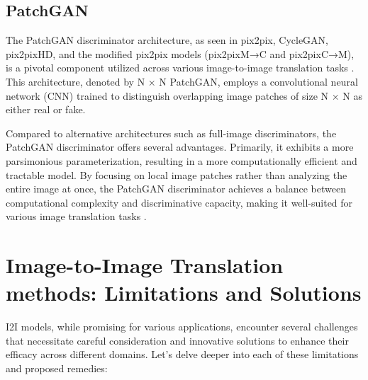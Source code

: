 \documentclass[UKenglish,12pt]{master-style}
\begin{document}
\subsection*{PatchGAN}

The PatchGAN discriminator architecture, as seen in pix2pix, CycleGAN, pix2pixHD, and the modified pix2pix models (pix2pixM→C and pix2pixC→M), is a pivotal component utilized across various image-to-image translation tasks \cite{patch_gan}. This architecture, denoted by N × N PatchGAN, employs a convolutional neural network (CNN) trained to distinguish overlapping image patches of size N × N as either real or fake.

Compared to alternative architectures such as full-image discriminators, the PatchGAN discriminator offers several advantages. Primarily, it exhibits a more parsimonious parameterization, resulting in a more computationally efficient and tractable model. By focusing on local image patches rather than analyzing the entire image at once, the PatchGAN discriminator achieves a balance between computational complexity and discriminative capacity, making it well-suited for various image translation tasks \cite{patch_gan}.

\section{Image-to-Image Translation methods: Limitations and Solutions}

I2I models, while promising for various applications, encounter several challenges that necessitate careful consideration and innovative solutions to enhance their efficacy across different domains. Let's delve deeper into each of these limitations and proposed remedies:
\end{document}
